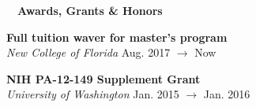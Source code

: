 \documentclass[a4paper,12pt]{article}
\newcommand{\resheading}[1]{{\hspace{-9pt} \colorbox{mygrey}{\begin{minipage}{\textwidth}{\textmd{~~\large \textbf{#1} \vphantom{p\^{E}}}}\end{minipage}}\vspace{6pt}} }
\newcommand{\ressubheading}[4]{{\begin{minipage}{\textwidth}
        \textbf{#1} \hfill #2 \\
        \textit{#3} \hfill #4 \\
        \end{minipage}}}
\begin{document}
        

        
        
\resheading{Awards, Grants \& Honors}
     \ressubheading{Full tuition waver for master's program}{}{New College of Florida}{Aug. 2017 $\rightarrow$ Now}
         
    \ressubheading{NIH PA-12-149 Supplement Grant}{}{University of Washington}{Jan. 2015 $\rightarrow$ Jan. 2016}
\end{document}
